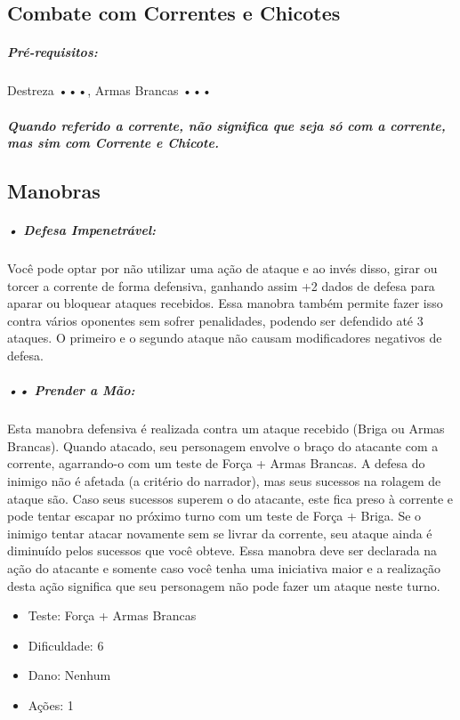 
\subsection{\bf Combate com Correntes e Chicotes}

\subparagraph*{\bf Pré-requisitos:} Destreza •••, Armas Brancas ••• 

\subparagraph*{Quando referido a corrente, não significa que seja só com a corrente, mas sim com Corrente e Chicote.}

\subsection{\bf Manobras}

\subparagraph{\bf • Defesa Impenetrável:} 
Você pode optar por não utilizar uma ação de ataque e ao invés disso, girar ou torcer a corrente de forma defensiva, ganhando assim +2 dados de defesa para aparar ou bloquear ataques recebidos. Essa manobra também permite fazer isso contra vários oponentes sem sofrer penalidades, podendo ser defendido até 3 ataques. O primeiro e o segundo ataque não causam modificadores negativos de defesa.

\subparagraph{\bf •• Prender a Mão:} 
Esta manobra defensiva é realizada contra um ataque recebido (Briga ou Armas Brancas). Quando atacado, seu personagem envolve o braço do atacante com a corrente, agarrando-o com um teste de Força + Armas Brancas. A defesa do inimigo não é afetada (a critério do narrador), mas seus sucessos na rolagem de ataque são. Caso seus sucessos superem o do atacante, este fica preso à corrente e pode tentar escapar no próximo turno com um teste de Força + Briga. Se o inimigo tentar atacar novamente sem se livrar da corrente, seu ataque ainda é diminuído pelos sucessos que você obteve. Essa manobra deve ser declarada na ação do atacante e somente caso você tenha uma iniciativa maior e a realização desta ação significa que seu personagem não pode fazer um ataque neste turno.
\begin{itemize}[noitemsep]
\item Teste: Força + Armas Brancas
\item Dificuldade: 6
\item Dano: Nenhum
\item Ações: 1
\end{itemize}

